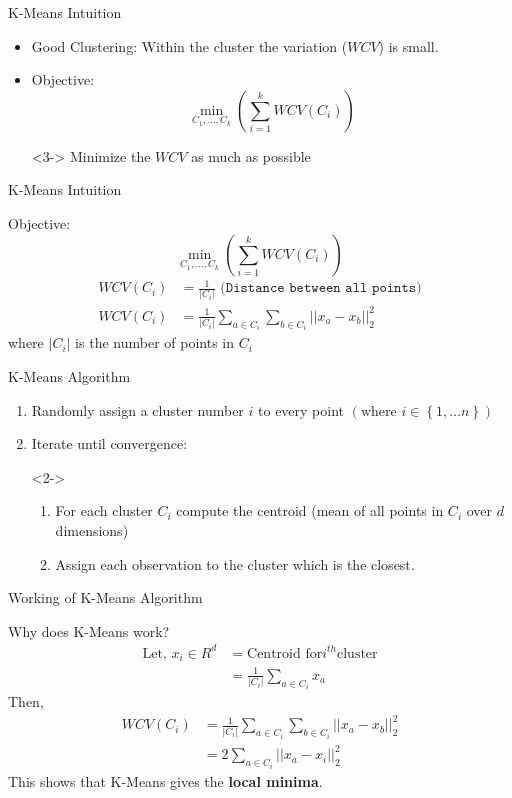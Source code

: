 \documentclass{beamer}
\begin{document}
\begin{frame}{K-Means Intuition}
\begin{itemize}
\item<1-> Good Clustering: Within the cluster the variation ($WCV$) is small.
\item<2-> Objective: $$ \min_{C_1,\ldots , C_k} \left( \sum_{i=1}^{k} WCV \left(C_i\right) \right) $$
\item[]<3-> Minimize the $WCV$ as much as possible
\end{itemize}
\end{frame}

\begin{frame}{K-Means Intuition}

Objective: $$ \min_{C_1,\ldots , C_k} \left( \sum_{i=1}^{k} WCV \left(C_i\right) \right) $$
\pause
\begin{align*}
WCV\left(C_i\right) &= \frac{1}{|C_i|}\texttt{ (Distance between all points)} \\
 WCV\left(C_i\right) &= \frac{1}{|C_i|}\sum_{a\in C_i}\sum_{b\in C_i}|| x_a - x_b ||_2^2
\end{align*}
where $|C_i|$ is the number of points in $C_i$
\end{frame}

\begin{frame}{K-Means Algorithm}
\begin{enumerate}
\item<1-> Randomly assign a cluster number $i$ to every point $\left(\text{where } i\in\left\lbrace 1, \ldots n \right\rbrace \right)$
\item<4-> Iterate until convergence:
\item[]<2-> \begin{enumerate}
\item<2-> For each cluster $C_i$ compute the centroid (mean of all points in $C_i$ over $d$ dimensions)
\item<3-> Assign each observation to the cluster which is the closest.
\end{enumerate}
\end{enumerate}
\end{frame}

\begin{frame}{Working of K-Means Algorithm}

\end{frame}
	
\begin{frame}{Why does K-Means work?}
\begin{align*}
\text{Let, } x_i\in R^d &= \text{Centroid for} i^{th} \text{cluster} \\
&= \frac{1}{|C_i|}\sum_{a\in C_i} x_a
\end{align*}
\pause
Then,
\begin{align*}
WCV\left(C_i\right) &= \frac{1}{|C_i|}\sum_{a\in C_i}\sum_{b\in C_i}|| x_a - x_b ||_2^2 \\
&= 2\sum_{a\in C_i} ||x_a - x_i||_2^2
\end{align*}
\pause
This shows that K-Means gives the \textbf{local minima}.
\end{frame}
\end{document}
